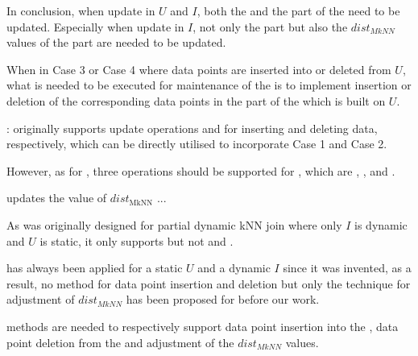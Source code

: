 In conclusion, when update in $U$ and $I$, both the \hdrtree and the \deltatree part of the \dualtree need to be updated. Especially when update in $I$, not only the \deltatree part but also the $dist_{MkNN}$ values of the \hdrtree part are needed to be updated.


When in Case 3 or Case 4 where data points are inserted into or deleted from $U$, what is needed to be executed for maintenance of the \dualtree is to implement insertion or deletion of the corresponding data points in the \hdrtree part of the \dualtree which is built on $U$.

: \deltatree originally supports update operations  and  for inserting and deleting data, respectively, which can be directly utilised to incorporate Case 1 and Case 2.

However, as for \hdrtree, three operations should be supported for \fdknnj, which are 
, , and .


 updates the value of $dist_\text{MkNN}$ ... 

As \hdrtree was originally designed for partial dynamic kNN join where only $I$ is dynamic and $U$ is static, it only supports  but not  and .

has always been applied for a static $U$ and a dynamic $I$ since it was invented, as a result, no method for data point insertion and deletion but only the technique for adjustment of $dist_{MkNN}$ has been proposed for \hdrtree before our work.

methods are needed to respectively support data point insertion into the \hdrtree, data point deletion from the \hdrtree and adjustment of the $dist_{MkNN}$ values. 

